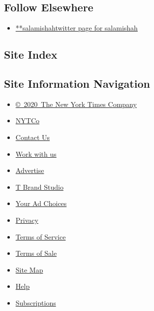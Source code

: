 \hypertarget{follow-elsewhere}{%
\subsection{Follow Elsewhere}\label{follow-elsewhere}}

\begin{itemize}
\tightlist
\item
  \href{https://twitter.com/salamishah}{**salamishahtwitter page for
  salamishah}
\end{itemize}

\hypertarget{site-index}{%
\subsection{Site Index}\label{site-index}}

\hypertarget{site-information-navigation}{%
\subsection{Site Information
Navigation}\label{site-information-navigation}}

\begin{itemize}
\tightlist
\item
  \href{https://help.nytimes.com/hc/en-us/articles/115014792127-Copyright-notice}{©~2020~The
  New York Times Company}
\end{itemize}

\begin{itemize}
\tightlist
\item
  \href{https://www.nytco.com/}{NYTCo}
\item
  \href{https://help.nytimes.com/hc/en-us/articles/115015385887-Contact-Us}{Contact
  Us}
\item
  \href{https://www.nytco.com/careers/}{Work with us}
\item
  \href{https://nytmediakit.com/}{Advertise}
\item
  \href{http://www.tbrandstudio.com/}{T Brand Studio}
\item
  \href{https://www.nytimes.com/privacy/cookie-policy\#how-do-i-manage-trackers}{Your
  Ad Choices}
\item
  \href{https://www.nytimes.com/privacy}{Privacy}
\item
  \href{https://help.nytimes.com/hc/en-us/articles/115014893428-Terms-of-service}{Terms
  of Service}
\item
  \href{https://help.nytimes.com/hc/en-us/articles/115014893968-Terms-of-sale}{Terms
  of Sale}
\item
  \href{https://spiderbites.nytimes.com}{Site Map}
\item
  \href{https://help.nytimes.com/hc/en-us}{Help}
\item
  \href{https://www.nytimes.com/subscription?campaignId=37WXW}{Subscriptions}
\end{itemize}
